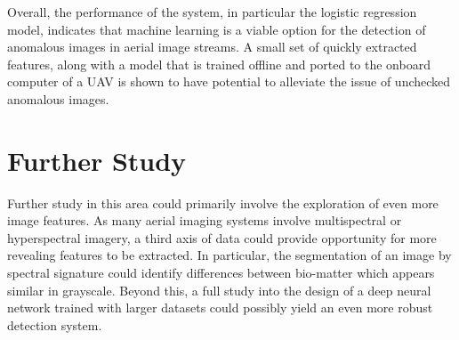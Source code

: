 Overall, the performance of the system, in particular the logistic regression model, indicates that machine learning is a viable option for the detection of anomalous images in aerial image streams.
A small set of quickly extracted features, along with a model that is trained offline and ported to the onboard computer of a UAV is shown to have potential to alleviate the issue of unchecked anomalous images.


\section{Further Study}
Further study in this area could primarily involve the exploration of even more image features.
As many aerial imaging systems involve multispectral or hyperspectral imagery, a third axis of data could provide opportunity for more revealing features to be extracted.
In particular, the segmentation of an image by spectral signature could identify differences between bio-matter which appears similar in grayscale.
Beyond this, a full study into the design of a deep neural network trained with larger datasets could possibly yield an even more robust detection system.

